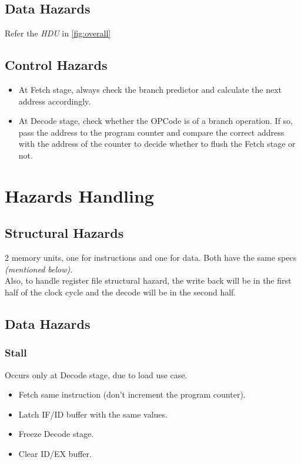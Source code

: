 \documentclass[12pt]{report}
\begin{document}
\subsection{Data Hazards}
Refer the \emph{HDU} in \ref{fig:overall}

\subsection{Control Hazards}
\begin{itemize}
    \item At Fetch stage, always check the branch predictor and calculate the next address accordingly.
    \item At Decode stage, check whether the OPCode is of a branch operation. If so, pass the address to the program counter and compare the correct address with the address of the counter to decide whether to flush the Fetch stage or not. 
\end{itemize}

\section{Hazards Handling}

\subsection{Structural Hazards}
2 memory units, one for instructions and one for data. Both have the same specs \emph{(mentioned below)}. \\
Also, to handle register file structural hazard, the write back will be in the first half of the clock cycle and the decode will be in the second half.

\subsection{Data Hazards}

\subsubsection{Stall}
Occurs only at Decode stage, due to load use case.
\begin{itemize}
    \item Fetch same instruction (don't increment the program counter).
    \item Latch IF/ID buffer with the same values.
    \item Freeze Decode stage.
    \item Clear ID/EX buffer.
\end{itemize}
\end{document}
